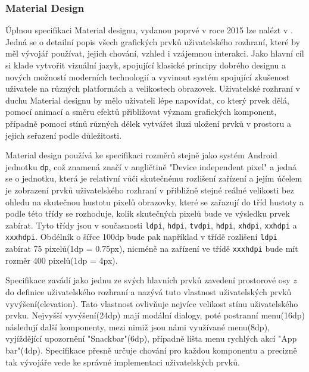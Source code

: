 \documentclass[czech,master,public,dept460,male,java,cpdeclaration]{diploma}
\begin{document}
\subsubsection{Material Design}
Úplnou specifikaci Material designu, vydanou poprvé v roce 2015 lze nalézt v \cite{materialdesign}.
Jedná se o detailní popis všech
grafických prvků uživatelského rozhraní, které by měl vývojář používat, jejich chování, vzhled i vzájemnou
 interakci. Jako hlavní cíl si klade vytvořit vizuální jazyk, spojující klasické principy dobrého designu
  a nových možností moderních technologií a vyvinout systém spojující zkušenost uživatele na různých
  platformách a velikostech obrazovek\cite{materialdesign}. Uživatelské rozhraní v duchu Material designu
  by mělo uživateli lépe napovídat, co který prvek dělá, pomocí animací a směru efektů přibližovat
  význam grafických komponent, případně pomocí stínů různých délek vytvářet iluzi uložení prvků
  v prostoru a jejich seřazení podle důležitosti.

  Material design používá ke specifikaci rozměrů
  stejně jako systém Android jednotku \texttt{dp}, což znamená značí v angličtině "Device independent
  pixel" a jedná se o jednotku, která je relativní vůči skutečnému rozlišení zařízení a jejím účelem
  je zobrazení prvků uživatelského rozhraní v přibližně stejné reálné velikosti bez ohledu na skutečnou
  hustotu pixelů obrazovky, které se zařazují do tříd hustoty a podle této třídy se rozhoduje,
  kolik skutečných pixelů bude ve výsledku prvek zabírat. Tyto třídy jsou v současnosti
  \texttt{ldpi}, \texttt{hdpi}, \texttt{tvdpi}, \texttt{hdpi}, \texttt{xhdpi}, \texttt{xxhdpi} a \texttt{xxxhdpi}.
  Obdélník o šířce 100dp bude pak například v třídě rozlišení \texttt{ldpi} zabírat 75 pixelů(1dp = 0.75px),
  nicméně na zařízení ve třídě \texttt{xxxhdpi} bude mít rozměr 400 pixelů(1dp = 4px).

  Specifikace zavádí jako jednu ze svých hlavních prvků zavedení prostorové osy \textit{z} do
  definice uživatelského rozhraní a nazývá tuto vlastnost uživatelských prvků vyvýšení(elevation)\cite{materialdesign}.
  Tato vlastnost ovlivňuje nejvíce velikost stínu uživatelského prvku. Nejvyšší vyvýšení(24dp)
  mají modální dialogy, poté postranní menu(16dp) následují další komponenty, mezi nimiž jsou námi využívané
  menu(8dp), vyjíždějící upozornění "Snackbar"(6dp), případně lišta menu rychlých akcí "App bar"(4dp)\cite{materialdesign}.
  Specifikace přesně určuje chování pro každou komponentu a precizně tak vývojáře vede ke správné
  implementaci uživatelských prvků.
\end{document}
